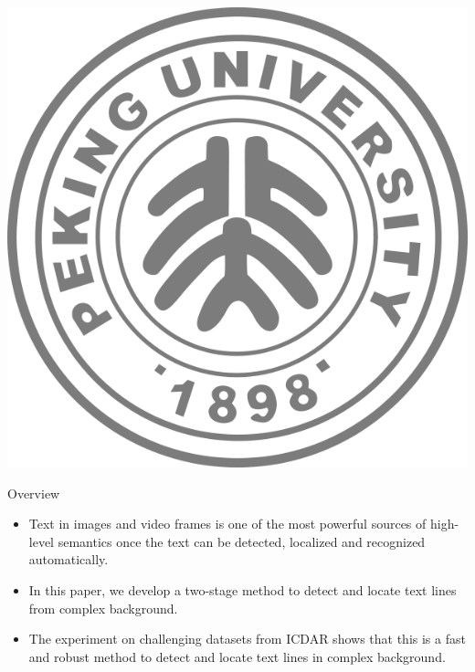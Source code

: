 \documentclass[a0paper,portrait]{baposter}
\begin{document}
\begin{poster}
{
  \includegraphics[height=0.75\headerheight]{pku_neg}
}









\begin{posterbox}[name=overview,column=0,row=0]{Overview}
\begin{itemize}
  \item Text in images and video frames is one of the most powerful sources of high-level semantics once the text can be detected, localized and recognized automatically.
  \item In this paper, we develop a two-stage method to detect and locate text lines from complex background.
  \item The experiment on challenging datasets from ICDAR shows that this is a fast and robust method to detect and locate text lines in complex background.
\end{itemize}
\end{posterbox}










\end{poster}
\end{document}
